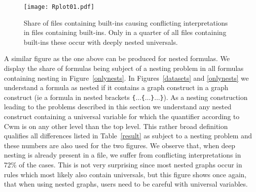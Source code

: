 \begin{figure}
 \texttt{[image: Rplot01.pdf]}
 \caption{Share of files containing built-ins causing conflicting interpretations in
 files containing built-ins. Only in a quarter of all files containing built-ins 
 these occur with deeply nested universals.
\label{builtins}}
\end{figure}  
 
A similar figure as the one above can be produced for nested formulas. We display the share of formulas being subject of a nesting problem in all 
formulas containing nesting in Figure~\ref{onlynests}. In Figures~\ref{datasets} and \ref{onlynests} we understand a formula as nested if it contains 
a graph construct in a graph construct (ie a formula in nested brackets \texttt{\{}$\ldots$\texttt{\{}$\ldots$\texttt{\}}$\ldots$\texttt{\}}). 
As a nesting construction leading to the problems described in this section we understand any nested construct containing a universal variable 
for which the quantifier according to Cwm is %
on any other level than the top level. This rather broad definition qualifies all differences listed in Table~\ref{result} as subject to a nesting problem and these 
numbers are also used for the two figures.
% 
We observe that, when deep nesting is already present in a file, we suffer from conflicting interpretations in 72\% of the cases.
This is not very surprising since most nested graphs occur in rules which most likely also contain universals, but this figure shows once again, that when using nested graphs, users need to be careful 
with universal variables.

